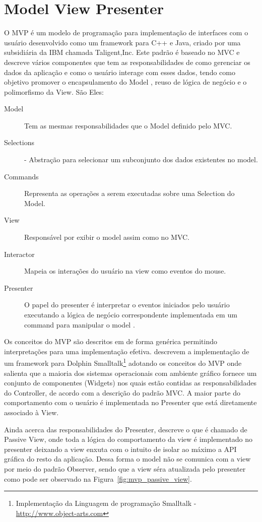 \section{Model View Presenter}

O MVP é um modelo de programação para implementação de interfaces com o usuário
desenvolvido como um framework para C++ e Java, criado por uma subsidiária da
IBM chamada Taligent,Inc. Este padrão é baseado no MVC e descreve vários
componentes que tem as responsabilidades de como gerenciar os dados da aplicação
e como o usuário interage com esses dados, tendo como objetivo promover o
encapsulamento do Model , reuso de lógica de negócio e o polimorfismo da View.
São Eles:

\begin{description}
  \item[Model] Tem as mesmas responsabilidades que o Model definido pelo MVC.
  \item[Selections] - Abstração para selecionar um subconjunto dos dados
  existentes no model.
  \item [Commands] Representa as operações a serem executadas sobre uma
  Selection do Model.
  \item [View] Responsável por exibir o model assim como no MVC.
  \item [Interactor] Mapeia os interações do usuário na view como eventos do
  mouse.
  \item [Presenter] O papel do presenter é interpretar o eventos iniciados pelo
  usuário executando a lógica de negócio correspondente implementada em um
  command para manipular o model \cite{Potel96mvp}.
\end{description}


Os conceitos do MVP são descritos em  de forma genérica
permitindo interpretações para uma implementação efetiva.
 descrevem a implementação de um framework para
Dolphin Smalltalk\footnote{Implementação da Linguagem de programação Smalltalk - 
\url{http://www.object-arts.com}} adotando os conceitos do MVP onde salienta que
a maioria dos sistemas operacionais com ambiente gráfico fornece um conjunto de
componentes (Widgets) nos quais estão contidas as responsabilidades do
Controller, de acordo com a descrição do padrão MVC. A maior parte do
comportamento com o usuário é implementada no Presenter que está
diretamente associado à View.

Ainda acerca das responsabilidades do Presenter,  descreve
o que é chamado de Passive View, onde toda a lógica do comportamento da view é
implementado no presenter deixando a view enxuta com o intuito de isolar ao
máximo a API gráfica do resto da aplicação. Dessa forma o model não se comunica
com a view por meio do padrão Observer, sendo que a view séra atualizada
pelo presenter como pode ser observado na Figura~\ref{fig:mvp_passive_view}.

